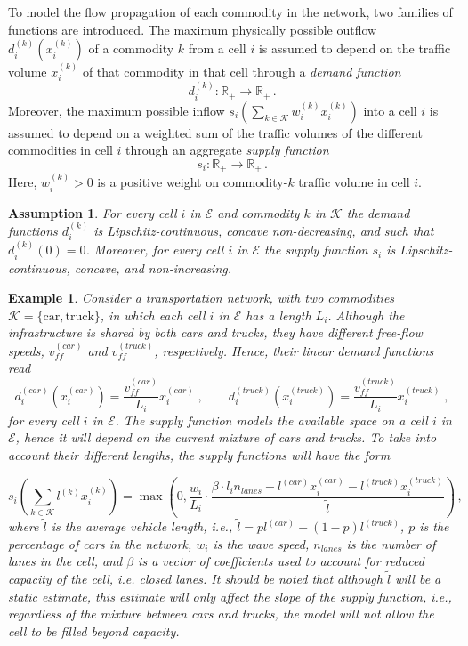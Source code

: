 \documentclass[preprint,12pt]{elsarticle}
\newtheorem{assumption}{Assumption}
\newtheorem{example}{Example}
\newcommand{\be}{\begin{equation}}
\newcommand{\ee}{\end{equation}}
\newcommand{\mc}{\mathcal}
\newcommand{\R}{\mathbb{R}}
\begin{document}
To model the flow propagation of each commodity in the network, two families of functions are introduced. The maximum physically possible outflow $d_i^{(k)}(x_i^{(k)})$ of a commodity $k$ from a cell $i$ is assumed to depend on the traffic volume $x_i^{(k)}$ of  that commodity in that cell through a \emph{demand function} $$d_i^{(k)}: \R_+ \rightarrow \R_+\,.$$ Moreover, the maximum possible inflow $s_i(\sum\nolimits_{k \in \mc{K}}{w_i^{(k)}x_i^{(k)}})$ into a cell $i$ is assumed to depend on a weighted sum of the traffic volumes of the different commodities in cell $i$ through an aggregate \emph{supply function}  $$s_i: \R_+ \rightarrow \R_+\,.$$ Here, $w_i^{(k)}> 0$ is a positive weight on commodity-$k$ traffic volume in cell $i$. 
\begin{assumption}\label{ass:1}
	For every cell $i$ in $\mc{E}$ and commodity $k$ in $\mc{K}$ the demand functions $d_i^{(k)}$ is Lipschitz-continuous, concave non-decreasing, and such that $d_i^{(k)}(0) = 0$. Moreover, for every cell $i$ in $\mc{E}$ the supply function $s_i$ is Lipschitz-continuous, concave, and non-increasing.
\end{assumption}

\begin{example} \label{ex:dcartrucks}
	Consider a transportation network, with two commodities $\mc K = \{\text{car}, \text{truck}\}$,  in which each cell $i$ in $\mc{E}$ has a length $L_i$. Although the infrastructure is shared by both cars and trucks, they have different free-flow speeds,  $v_{ff}^{(car)}$ and $v_{ff}^{(truck)}$, respectively. Hence, their linear demand functions read
	\be\label{eq:dmnd}
	d^{(car)}_i(x_i^{(car)}) = \frac{v_{ff}^{(car)}}{L_i}x_i^{(car)}\;, \qquad d^{(truck)}_i(x_i^{(truck)}) = \frac{v_{ff}^{(truck)}}{L_i}x_i^{(truck)}\;, 
	\ee
	for every cell $i$ in $\mc E$.
	The supply function models the available space on a cell $i$ in $\mc{E}$, hence it will depend on the current mixture of cars and trucks. To take into account their different lengths, the supply functions will have the form
	
	\be\label{eq:supply}
		s_i\left(\sum\limits_{k \in \mc{K}}l^{(k)}x_i^{(k)}\right) = \max \left(0,\frac{w_i}{L_i} \cdot \frac{\beta \cdot l_i n_{lanes}  - l^{(car)}x_i^{(car)} - l^{(truck)}x_i^{(truck)}}{\tilde{l}}\right) \,,
	\ee
	where $\tilde{l}$ is the average vehicle length, i.e., $ \tilde{l} = pl^{(car)} + (1-p)l^{(truck)}$, $p$ is the percentage of cars in the network, $w_i$ is the wave speed, $n_{lanes}$ is the number of lanes in the cell, and $\beta$ is a vector of coefficients used to account for reduced capacity of the cell, i.e. closed lanes. It should be noted that although $\tilde{l}$ will be a static estimate, this estimate will only affect the slope of the supply function, i.e., regardless of the mixture between cars and trucks, the model will not allow the cell to be filled beyond capacity.
\end{example}
\end{document}
